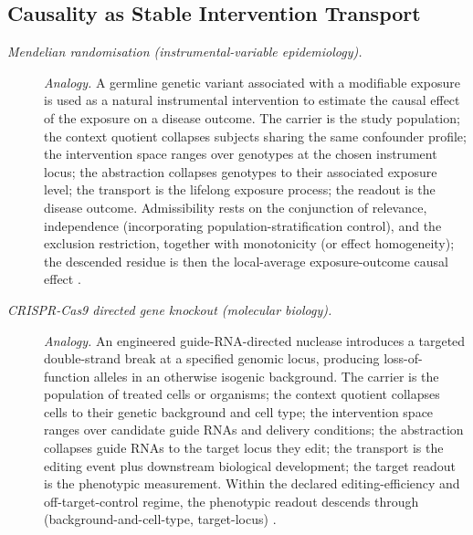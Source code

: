 \endgroup

\subsection*{ Causality as Stable Intervention Transport}
\begingroup\small
\begin{description}
\item[\emph{Mendelian randomisation
(instrumental-variable epidemiology).}] \textit{Analogy.}
A germline genetic variant associated with a modifiable
exposure is used as a natural instrumental intervention
to estimate the causal effect of the exposure on a
disease outcome.  The carrier is the study population;
the context quotient collapses subjects sharing the
same confounder profile; the intervention space ranges
over genotypes at the chosen instrument locus; the
abstraction collapses genotypes to their associated
exposure level; the transport is the lifelong exposure
process; the readout is the disease outcome.
Admissibility rests on the conjunction of relevance,
independence (incorporating population-stratification
control), and the exclusion restriction, together with monotonicity (or effect homogeneity); the descended
residue is then the local-average exposure-outcome causal
effect \citep{DaveySmith2003Mendelian}.

\item[\emph{CRISPR-Cas9 directed gene knockout
(molecular biology).}] \textit{Analogy.}
An engineered guide-RNA-directed nuclease introduces a
targeted double-strand break at a specified genomic
locus, producing loss-of-function alleles in an
otherwise isogenic background.  The carrier is the
population of treated cells or organisms; the context
quotient collapses cells to their genetic background and
cell type; the intervention space ranges over candidate
guide RNAs and delivery conditions; the abstraction
collapses guide RNAs to the target locus they edit; the
transport is the editing event plus downstream
biological development; the target readout is the
phenotypic measurement.  Within the declared
editing-efficiency and off-target-control regime, the
phenotypic readout descends through
(background-and-cell-type, target-locus)
\citep{Jinek2012CRISPR}.


\end{description}
